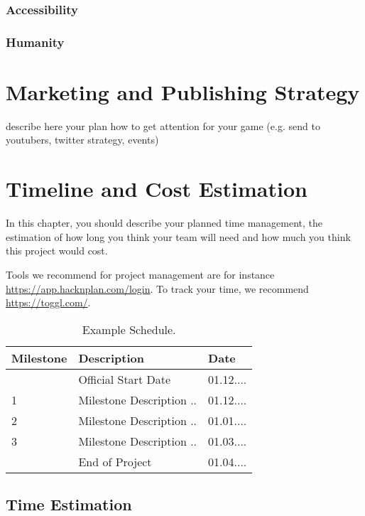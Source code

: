 \documentclass[a4paper]{scrreprt}
\begin{document}
\subsection{Accessibility}
\subsection{Humanity}



\chapter{Marketing and Publishing Strategy}

describe here your plan how to get attention for your game (e.g. send to youtubers, twitter strategy, events) 





\chapter{Timeline and Cost Estimation}

In this chapter, you should describe your planned time management, the estimation of how long you think your team will need and how much you think this project would cost. 

Tools we recommend for project management are for instance \url{https://app.hacknplan.com/login}. To track your time, we recommend \url{https://toggl.com/}.  

\begin{table}[h]
\centering
\begin{tabular}{|l|l|l|}
\hline
Milestone & Description & Date \\\hline
& Official Start Date & 01.12.... \\
1 & Milestone Description ..  & 01.12.... \\
2 & Milestone Description ..  & 01.01.... \\
3 & Milestone Description ..  & 01.03.... \\
& End of Project & 01.04.... \\
\hline
\end{tabular}
\caption{\label{tab:schedule}Example Schedule.}
\end{table}

\section{Time Estimation}
\end{document}
